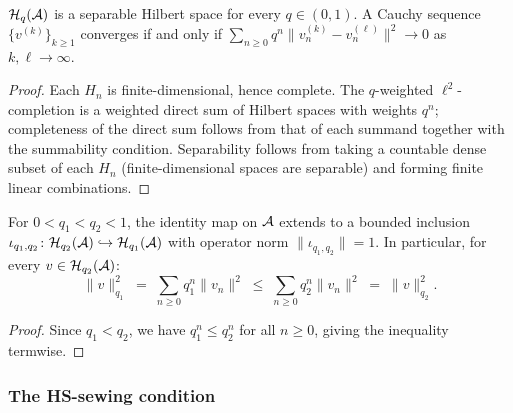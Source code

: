 \begin{lemma}
$\mathcal{H}_q(\mathcal{A})$ is a separable Hilbert space for every $q \in (0,1)$. A Cauchy sequence $\{v^{(k)}\}_{k \geq 1}$ converges if and only if $\sum_{n \geq 0} q^n \|v^{(k)}_n - v^{(\ell)}_n\|^2 \to 0$ as $k, \ell \to \infty$.
\end{lemma}

\begin{proof}
Each $H_n$ is finite-dimensional, hence complete. The $q$-weighted $\ell^2$-completion is a weighted direct sum of Hilbert spaces with weights $q^n$; completeness of the direct sum follows from that of each summand together with the summability condition. Separability follows from taking a countable dense subset of each $H_n$ (finite-dimensional spaces are separable) and forming finite linear combinations.
\end{proof}

\begin{proposition}
For $0 < q_1 < q_2 < 1$, the identity map on $\mathcal{A}$ extends to a bounded inclusion $\iota_{q_1,q_2} \colon \mathcal{H}_{q_2}(\mathcal{A}) \hookrightarrow \mathcal{H}_{q_1}(\mathcal{A})$ with operator norm $\|\iota_{q_1,q_2}\| = 1$. In particular, for every $v \in \mathcal{H}_{q_2}(\mathcal{A})$:
\begin{equation}%
\|v\|_{q_1}^2 \;=\; \sum_{n \geq 0} q_1^n \|v_n\|^2 \;\leq\; \sum_{n \geq 0} q_2^n \|v_n\|^2 \;=\; \|v\|_{q_2}^2.
\end{equation}
\end{proposition}

\begin{proof}
Since $q_1 < q_2$, we have $q_1^n \leq q_2^n$ for all $n \geq 0$, giving the inequality termwise.
\end{proof}

\subsubsection{The HS-sewing condition}

